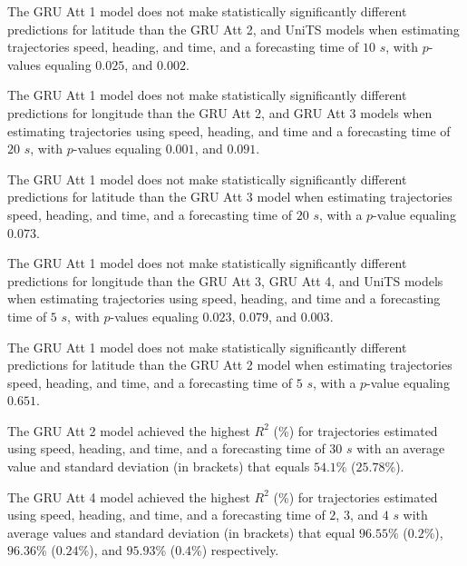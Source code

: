 
The GRU Att 1 model does not make statistically significantly different predictions for latitude than the GRU Att 2, and UniTS models when estimating trajectories speed, heading, and time, and a forecasting time of $10$ $s$, with $p$-values equaling $0.025$, and $0.002$.


The GRU Att 1 model does not make statistically significantly different predictions for longitude than the GRU Att 2, and GRU Att 3 models when estimating trajectories using speed, heading, and time and a forecasting time of $20$ $s$, with $p$-values equaling $0.001$, and $0.091$.


The GRU Att 1 model does not make statistically significantly different predictions for latitude than the GRU Att 3 model when estimating trajectories speed, heading, and time, and a forecasting time of $20$ $s$, with a $p$-value equaling $0.073$.


The GRU Att 1 model does not make statistically significantly different predictions for longitude than the GRU Att 3, GRU Att 4, and UniTS models when estimating trajectories using speed, heading, and time and a forecasting time of $5$ $s$, with $p$-values equaling $0.023$, $0.079$, and $0.003$.


The GRU Att 1 model does not make statistically significantly different predictions for latitude than the GRU Att 2 model when estimating trajectories speed, heading, and time, and a forecasting time of $5$ $s$, with a $p$-value equaling $0.651$.


The GRU Att 2 model achieved the highest $R^{2}$ (\%) for trajectories estimated using speed, heading, and time, and a forecasting time of $30$ $s$ with an average value and standard deviation (in brackets) that equals $54.1$\% ($25.78$\%).

The GRU Att 4 model achieved the highest $R^{2}$ (\%) for trajectories estimated using speed, heading, and time, and a forecasting time of $2$, $3$, and $4$ $s$ with average values and standard deviation (in brackets) that equal $96.55$\% ($0.2$\%), $96.36$\% ($0.24$\%), and $95.93$\% ($0.4$\%) respectively.

